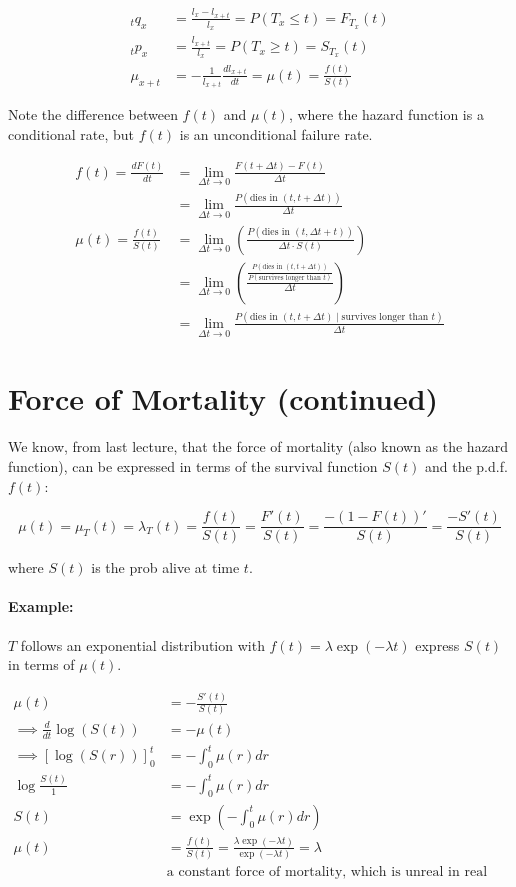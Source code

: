 \documentclass[a4paper, 11pt, twoside]{article}
\begin{document}
\[\begin{split}
	{}_tq_x&=\frac{l_x-l_{x+t}}{l_x}=P(T_x\leq t)=F_{T_x}(t)\\
	{}_tp_x&=\frac{l_{x+t}}{l_x}=P(T_x\geq t)=S_{T_x}(t)\\
	\mu_{x+t}&=-\frac1{l_{x+t}}\frac{dl_{x+t}}{dt}=\mu(t)=\frac{f(t)}{S(t)}
\end{split}
\]

Note the difference between $f(t)$ and $\mu(t)$, where the hazard function is a conditional rate, but $f(t)$ is an unconditional failure rate.

\[
\begin{split}
	f(t)=\frac{dF(t)}{dt}&=\lim_{\Delta t\to 0}\frac{F(t+\Delta t)-F(t)}{\Delta t}\\
	&=\lim_{\Delta t\to 0}\frac{P(\text{dies in } (t,t+\Delta t))}{\Delta t}\\
	\mu(t)=\frac{f(t)}{S(t)}&=\lim_{\Delta t\to 0}\left(\frac{P(\text{dies in }(t,\Delta t+t))}{\Delta t\cdot S(t)}\right)\\
	&=\lim_{\Delta t\to 0}\left(\frac{\frac{P(\text{dies in }(t,t+\Delta t))}{P(\text{survives longer than }t)}}{\Delta t}\right)\\
	&=\lim_{\Delta t\to 0}\frac{P(\text{dies in }(t, t+\Delta t) \mid \text{survives longer than }t)}{\Delta t}
\end{split}
\]

\section{Force of Mortality (continued)}
We know, from last lecture, that the force of mortality (also known as the hazard function), can be expressed in terms of the survival function $S(t)$ and the p.d.f. $f(t)$:

\[\mu(t)=\mu_T(t)=\lambda_T(t)=\frac{f(t)}{S(t)}=\frac{F'(t)}{S(t)}=\frac{-(1-F(t))'}{S(t)}=\frac{-S'(t)}{S(t)}\]

where $S(t)$ is the prob alive at time $t$.

\paragraph{Example:} $T$ follows an exponential distribution with $f(t)=\lambda\exp(-\lambda t)$ express $S(t)$ in terms of $\mu(t)$.

\[
\begin{split}
	\mu(t)&=-\frac{S'(t)}{S(t)}\\
	\implies\frac{d}{dt}\log(S(t))&=-\mu(t)\\
	\implies \left[\log(S(r))\right]^t_0&=-\int^t_0\mu(r)dr\\
	\log\frac{S(t)}{1}&=-\int^t_0\mu(r)dr\\
	S(t)&=\exp\left(-\int^t_0\mu(r)dr\right)\\
	\mu(t)&=\frac{f(t)}{S(t)}=\frac{\lambda\exp(-\lambda t)}{\exp(-\lambda t)}=\lambda\\&\text{a constant force of mortality, which is unreal in real life}
\end{split}
\]
\end{document}
